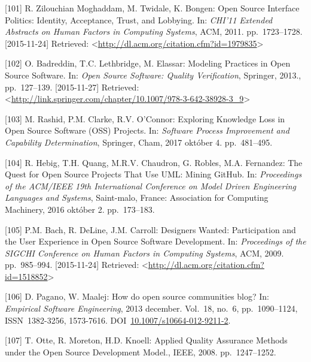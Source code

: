 \documentclass[12pt,magyar,a4paper,oneside]{scrreprt}
\newenvironment{cslreferences}%
  {}%
  {\par}
\begin{document}
\begin{cslreferences}
\leavevmode\hypertarget{ref-zilouchian_moghaddam_open_2011}{}%
{[}101{]} R. Zilouchian Moghaddam, M. Twidale, K. Bongen: Open Source
Interface Politics: Identity, Acceptance, Trust, and Lobbying. In:
\emph{CHI'11 Extended Abstracts on Human Factors in Computing Systems},
ACM, 2011. pp.~1723--1728. {[}2015-11-24{]} Retrieved:
\textless{}\url{http://dl.acm.org/citation.cfm?id=1979835}\textgreater{}

\leavevmode\hypertarget{ref-badreddin_modeling_2013}{}%
{[}102{]} O. Badreddin, T.C. Lethbridge, M. Elassar: Modeling Practices
in Open Source Software. In: \emph{Open Source Software: Quality
Verification}, Springer, 2013., pp.~127--139. {[}2015-11-27{]}
Retrieved:
\textless{}\url{http://link.springer.com/chapter/10.1007/978-3-642-38928-3_9}\textgreater{}

\leavevmode\hypertarget{ref-rashid_exploring_2017}{}%
{[}103{]} M. Rashid, P.M. Clarke, R.V. O'Connor: Exploring Knowledge
Loss in Open Source Software (OSS) Projects. In: \emph{Software Process
Improvement and Capability Determination}, Springer, Cham, 2017 október
4. pp.~481--495.

\leavevmode\hypertarget{ref-hebig_quest_2016}{}%
{[}104{]} R. Hebig, T.H. Quang, M.R.V. Chaudron, G. Robles, M.A.
Fernandez: The Quest for Open Source Projects That Use UML: Mining
GitHub. In: \emph{Proceedings of the ACM/IEEE 19th International
Conference on Model Driven Engineering Languages and Systems},
Saint-malo, France: Association for Computing Machinery, 2016 október 2.
pp.~173--183.

\leavevmode\hypertarget{ref-bach_designers_2009}{}%
{[}105{]} P.M. Bach, R. DeLine, J.M. Carroll: Designers Wanted:
Participation and the User Experience in Open Source Software
Development. In: \emph{Proceedings of the SIGCHI Conference on Human
Factors in Computing Systems}, ACM, 2009. pp.~985--994. {[}2015-11-24{]}
Retrieved:
\textless{}\url{http://dl.acm.org/citation.cfm?id=1518852}\textgreater{}

\leavevmode\hypertarget{ref-pagano_how_2013}{}%
{[}106{]} D. Pagano, W. Maalej: How do open source communities blog? In:
\emph{Empirical Software Engineering}, 2013 december. Vol.~18, no.~6,
pp.~1090--1124, ISSN~1382-3256, 1573-7616.
DOI~\href{https://doi.org/10.1007/s10664-012-9211-2}{10.1007/s10664-012-9211-2}.

\leavevmode\hypertarget{ref-otte_applied_2008}{}%
{[}107{]} T. Otte, R. Moreton, H.D. Knoell: Applied Quality Assurance
Methods under the Open Source Development Model., IEEE, 2008.
pp.~1247--1252.


\end{cslreferences}
\end{document}
